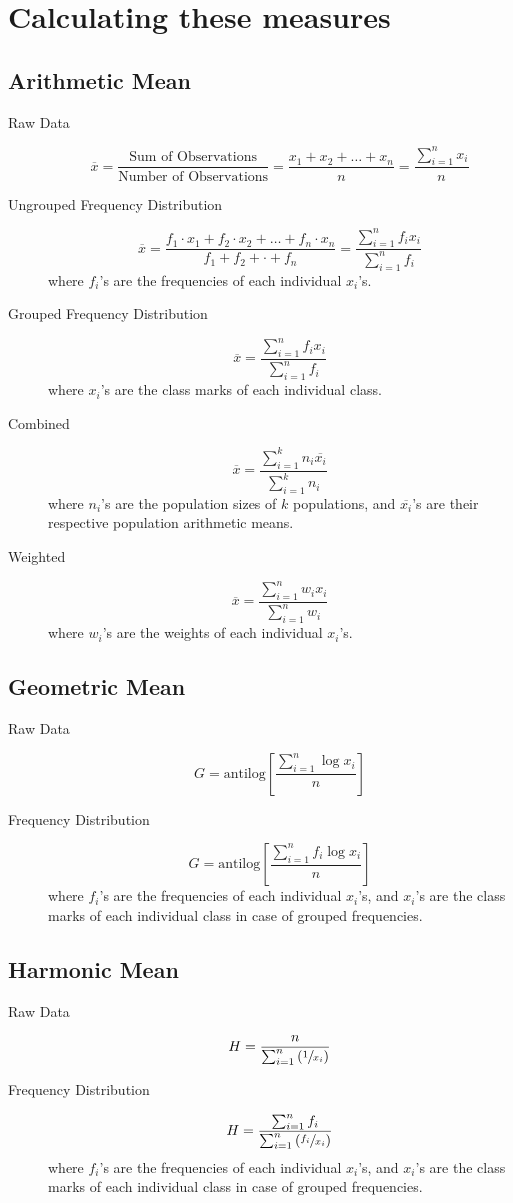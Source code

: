 \documentclass[
10pt, %
a4paper, %
]{report}
\begin{document}
\section*{Calculating these measures}

\subsection*{Arithmetic Mean}
\begin{description}
\item[Raw Data]
\[
\overline{x} = \frac{\text{Sum of Observations}}{\text{Number of Observations}} = \frac{x_1 + x_2 + \dots + x_n}{n} = \frac{\sum_{i=1}^n x_i}{n}
\]
\item[Ungrouped Frequency Distribution]
\[
\overline{x} = \frac{f_1 \cdot x_1 + f_2 \cdot x_2 + \dots + f_n \cdot x_n}{f_1 + f_2 + \cdot + f_n} = \frac{\sum_{i=1}^n f_i x_i}{\sum_{i=1}^n f_i}
\]
where \(f_i\)'s are the frequencies of each individual \(x_i\)'s.
\item[Grouped Frequency Distribution]
\[
\overline{x} = \frac{\sum_{i=1}^n f_i x_i}{\sum_{i=1}^n f_i}
\]
where \(x_i\)'s are the class marks of each individual class.
\item[Combined]
\[
\overline{x} = \frac{\sum_{i=1}^k n_i \overline{x_i}}{\sum_{i=1}^k n_i}
\]
where \(n_i\)'s are the population sizes of \(k\) populations, and \(\overline{x_i}\)'s are their respective population arithmetic means.
\item[Weighted]
\[
\overline{x} = \frac{\sum_{i=1}^n w_i x_i}{\sum_{i=1}^n w_i}
\]
where \(w_i\)'s are the weights of each individual \(x_i\)'s.
\end{description}

\subsection*{Geometric Mean}
\begin{description}
\item[Raw Data]
\[
G = \mathrm{antilog} \left[ \frac{\sum_{i=1}^n \log x_i}{n} \right]
\]
\item[Frequency Distribution]
\[
G = \mathrm{antilog} \left[ \frac{\sum_{i=1}^n f_i \log x_i}{n} \right]
\]
where \(f_i\)'s are the frequencies of each individual \(x_i\)'s, and \(x_i\)'s are the class marks of each individual class in case of grouped frequencies.
\end{description}

\subsection*{Harmonic Mean}
\begin{description}
\item[Raw Data]
\[
H = \dfrac{n}{\sum_{i=1}^n \left( \sfrac{1}{x_i} \right)}
\]
\item[Frequency Distribution]
\[
H = \dfrac{\sum_{i=1}^{n} f_i}{\sum_{i=1}^{n} \left( \sfrac{f_i}{x_i} \right)}
\]
where \(f_i\)'s are the frequencies of each individual \(x_i\)'s, and \(x_i\)'s are the class marks of each individual class in case of grouped frequencies.
\end{description}
\end{document}
